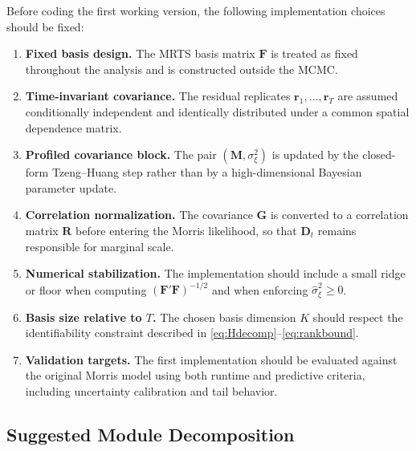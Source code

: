\documentclass[11pt]{article}
\newcommand{\bD}{\mathbf{D}}
\newcommand{\bF}{\mathbf{F}}
\newcommand{\bG}{\mathbf{G}}
\newcommand{\bM}{\mathbf{M}}
\newcommand{\bR}{\mathbf{R}}
\newcommand{\br}{\mathbf{r}}
\begin{document}
Before coding the first working version, the following implementation choices
should be fixed:
\begin{enumerate}[leftmargin=2em]
\item \textbf{Fixed basis design.} The MRTS basis matrix $\bF$ is treated as
fixed throughout the analysis and is constructed outside the MCMC.
\item \textbf{Time-invariant covariance.} The residual replicates
$\br_1, \ldots, \br_T$ are assumed conditionally independent and identically
distributed under a common spatial dependence matrix.
\item \textbf{Profiled covariance block.} The pair $(\bM, \sigma_\xi^2)$ is
updated by the closed-form Tzeng--Huang step rather than by a high-dimensional
Bayesian parameter update.
\item \textbf{Correlation normalization.} The covariance $\bG$ is converted to a
correlation matrix $\bR$ before entering the Morris likelihood, so that
$\bD_t$ remains responsible for marginal scale.
\item \textbf{Numerical stabilization.} The implementation should include a
small ridge or floor when computing $(\bF' \bF)^{-1/2}$ and when enforcing
$\widehat{\sigma}_\xi^2 \ge 0$.
\item \textbf{Basis size relative to $T$.} The chosen basis dimension $K$ should
respect the identifiability constraint described in
\eqref{eq:Hdecomp}--\eqref{eq:rankbound}.
\item \textbf{Validation targets.} The first implementation should be evaluated
against the original Morris model using both runtime and predictive criteria,
including uncertainty calibration and tail behavior.
\end{enumerate}

\subsection{Suggested Module Decomposition}
\end{document}

